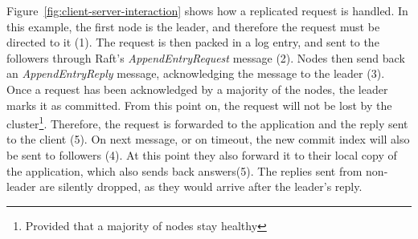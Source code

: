 Figure~\ref{fig:client-server-interaction} shows how a replicated request is handled.
In this example, the first node is the leader, and therefore the request must be directed to it (1).
The request is then packed in a log entry, and sent to the followers through Raft's \emph{AppendEntryRequest} message (2).
Nodes then send back an \emph{AppendEntryReply} message, acknowledging the message to the leader (3).
Once a request has been acknowledged by a majority of the nodes, the leader marks it as committed.
From this point on, the request will not be lost by the cluster\footnote{Provided that a majority of nodes stay healthy}.
Therefore, the request is forwarded to the application and the reply sent to the client (5).
On next message, or on timeout, the new commit index will also be sent to followers (4).
At this point they also forward it to their local copy of the application, which also sends back answers(5).
The replies sent from non-leader are silently dropped, as they would arrive after the leader's reply.
